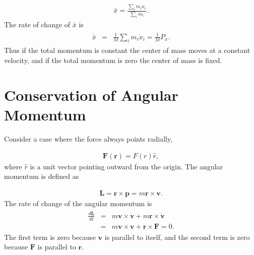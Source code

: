\documentclass[letterpaper,10pt,english]{sphinxmanual}
\begin{document}
\begin{equation*}
\begin{split}
\begin{equation}
\bar{x}=\frac{\sum_im_ix_i}{\sum_i m_i}.
\label{_auto29} \tag{32}
\end{equation}
\end{split}
\end{equation*}
The rate of change of \(\bar{x}\) is
\begin{equation*}
\begin{split}
\begin{eqnarray}
\dot{\bar{x}}&=&\frac{1}{M}\sum_i m_i\dot{x}_i=\frac{1}{M}P_x.
\end{eqnarray}
\end{split}
\end{equation*}
Thus if the total momentum is constant the center of mass moves at a
constant velocity, and if the total momentum is zero the center of
mass is fixed.


\section{Conservation of Angular Momentum}
\label{\detokenize{chapter1:conservation-of-angular-momentum}}
Consider a case where the force always points radially,




\begin{equation*}
\begin{split}
\begin{equation}
\boldsymbol{F}(\boldsymbol{r})=F(r)\hat{r},
\label{_auto30} \tag{33}
\end{equation}
\end{split}
\end{equation*}
where \(\hat{r}\) is a unit vector pointing outward from the origin. The angular momentum is defined as




\begin{equation*}
\begin{split}
\begin{equation}
\boldsymbol{L}=\boldsymbol{r}\times\boldsymbol{p}=m\boldsymbol{r}\times\boldsymbol{v}.
\label{_auto31} \tag{34}
\end{equation}
\end{split}
\end{equation*}
The rate of change of the angular momentum is
\begin{equation*}
\begin{split}
\begin{eqnarray}
\frac{d\boldsymbol{L}}{dt}&=&m\boldsymbol{v}\times\boldsymbol{v}+m\boldsymbol{r}\times\dot{\boldsymbol{v}}\\
\nonumber
&=&m\boldsymbol{v}\times\boldsymbol{v}+\boldsymbol{r}\times{\boldsymbol{F}}=0.
\end{eqnarray}
\end{split}
\end{equation*}
The first term is zero because \(\boldsymbol{v}\) is parallel to itself, and the
second term is zero because \(\boldsymbol{F}\) is parallel to \(\boldsymbol{r}\).
\end{document}
